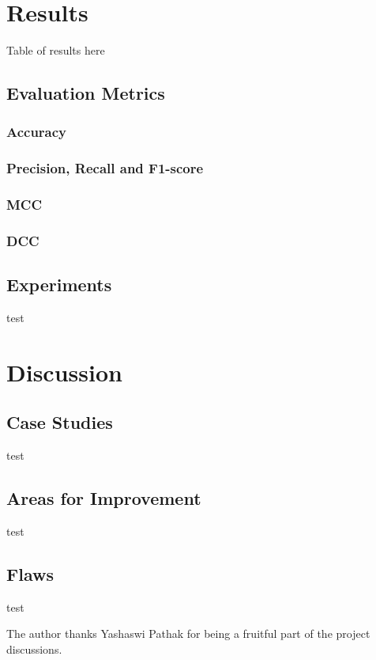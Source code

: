 \documentclass[journal=jacsat,manuscript=article]{achemso}
\begin{document}
\section{Results}
\quad Table of results here

\subsection{Evaluation Metrics}
\subsubsection{Accuracy}
\subsubsection{Precision, Recall and F1-score}
\subsubsection{MCC}
\subsubsection{DCC}

\subsection{Experiments}
\quad test

\section{Discussion}
\quad

\subsection{Case Studies}
\quad test

\subsection{Areas for Improvement}
\quad test

\subsection{Flaws}
\quad test

\begin{acknowledgement}
  The author thanks Yashaswi Pathak for being a fruitful part of the project discussions.

\end{acknowledgement}
\end{document}
